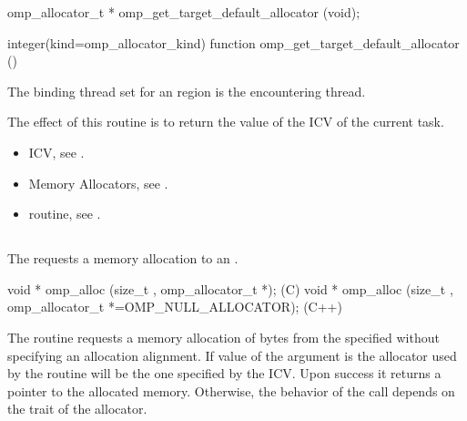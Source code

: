 \format
\ccppspecificstart
\begin{boxedcode}
omp_allocator_t * omp_get_target_default_allocator (void);
\end{boxedcode}
\ccppspecificend
\fortranspecificstart
\begin{boxedcode}
integer(kind=omp_allocator_kind) 
function omp_get_target_default_allocator ()
\end{boxedcode}
\fortranspecificend

\binding

The binding thread set for an  region is the encountering thread.

\effect

The effect of this routine is to return the value of the  ICV of the current task.

\crossreferences
\begin{itemize}
\item {} ICV, see .
\item Memory Allocators, see .
\item {} routine, see .
\end{itemize}

\ccppspecificstart


\subsection{}
\label{subsec:omp_alloc}

\summary
The  requests a memory allocation to an .

\format
\begin{boxedcode}
void * omp_alloc (size_t , omp_allocator_t *);  (C)
void * omp_alloc (size_t , 
           omp_allocator_t *=OMP_NULL_ALLOCATOR); (C++)
\end{boxedcode}

\effect

The  routine requests a memory allocation of  bytes from the specified  without specifying an allocation alignment. If value of the  argument is 
 the allocator used by the routine will be the one specified by the  ICV.
Upon success it returns a pointer to the allocated memory. Otherwise, the behavior of the call depends on the  trait of the allocator.

